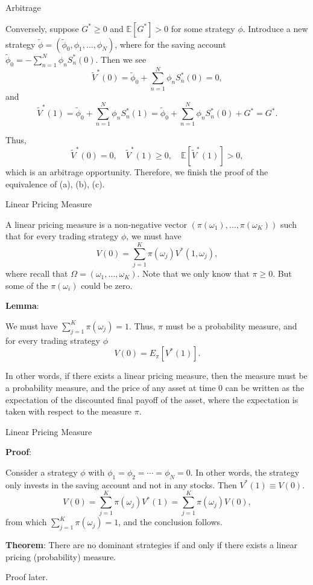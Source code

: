 \documentclass{beamer}
\begin{document}
\begin{frame}{Arbitrage}

    {\footnotesize \footnotesize
      Conversely, suppose $G^* \geq 0$ and $\mathbb{E}[G^*] > 0$ for some strategy $\phi$. Introduce a new strategy $\tilde{\phi} = (\tilde{\phi}_0, \phi_1, \ldots, \phi_N)$, where for the saving account $\tilde{\phi}_0 = -\sum_{n=1}^N \phi_n S_n^*(0)$. Then we see
\[
\tilde{V}^*(0) = \tilde{\phi}_0 + \sum_{n=1}^N \phi_n S_n^*(0) = 0,
\]
and
\[
\tilde{V}^*(1) = \tilde{\phi}_0 + \sum_{n=1}^{N} \phi_n S_n^*(1) = \tilde{\phi}_0 + \sum_{n=1}^{N} \phi_n S_n^*(0) + G^* = G^*.
\]

Thus,
\[
\tilde{V}^*(0) = 0, \quad \tilde{V}^*(1) \geq 0, \quad \mathbb{E}[\tilde{V}^*(1)] > 0,
\]
which is an arbitrage opportunity. Therefore, we finish the proof of the equivalence of (a), (b), (c).
    }
\end{frame}

\begin{frame}{Linear Pricing Measure}

    {\footnotesize \footnotesize
      A linear pricing measure is a non-negative vector $(\pi(\omega_1), \ldots, \pi(\omega_K))$ 
      such that for every trading strategy $\phi$, we must have
    \[
    V(0) = \sum_{j=1}^K \pi(\omega_j) V^*(1, \omega_j),
    \]
    where recall that $\Omega = (\omega_1, \ldots, \omega_K)$. 
    Note that we only know that $\pi \geq 0$. But some of the $\pi(\omega_i)$ could be zero.
    \par \textbf{Lemma}:
    \par We must have $\sum_{j=1}^K \pi(\omega_j) = 1$. Thus, $\pi$ must be a probability measure, and for every trading strategy $\phi$
\[
V(0) = E_\pi [V^*(1)].
\]

In other words, if there exists a linear pricing measure, 
then the measure must be a probability measure, and the price of any asset at time 0 can be written as the expectation of the discounted final 
payoff of the asset, where the expectation is taken with respect to the measure $\pi$.
    }
\end{frame}
\begin{frame}{Linear Pricing Measure}

    {\footnotesize \footnotesize
       \par \textbf{Proof}:
       \par Consider a strategy $\phi$ with $\phi_1 = \phi_2 = \cdots = \phi_N = 0$. In other words, the strategy only invests in the saving account and not in any stocks. Then $V^*(1) \equiv V(0)$.
\[
V(0) = \sum_{j=1}^K \pi(\omega_j) V^*(1) = \sum_{j=1}^K \pi(\omega_j) V(0),
\]
from which $\sum_{j=1}^K \pi(\omega_j) = 1$, and the conclusion follows.
\vspace{1em}

\par \textbf{Theorem}: There are no dominant strategies 
if and only if there exists a linear pricing (probability) measure.
\vspace{1em}
\par Proof later.
    }
\end{frame}
\end{document}
